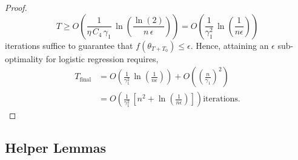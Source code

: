 \documentclass{article}
\begin{document}
\begin{proof}
\[
T \geq O \left( \frac{1}{\eta \,C_4\, \gamma_1} \, \ln\left(\frac{\ln(2)}{n \, \epsilon} \right) \right) =  O \left( \frac{1}{\gamma_1^2} \, \ln\left(\frac{1}{n \epsilon}\right) \right)
\]
iterations suffice to guarantee that $f(\theta_{T + T_0}) \leq \epsilon$. Hence, attaining an $\epsilon$ sub-optimality for logistic regression requires, 
\begin{align*}
T_{\text{final}} &= O \left( \frac{1}{\gamma_1^2} \, \ln\left(\frac{1}{n \epsilon}\right) \right) + O \left( \left(\frac{n}{\gamma_1}\right)^2  \right) \\
&= O\left(  \frac{1}{\gamma_1^2} \, \left[n^2 + \ln\left(\frac{1}{n \epsilon}\right)\right]\right) \text{iterations}. 
\end{align*}     
\end{proof}

\subsection{Helper Lemmas}
\label{app:adam-helper-lemmas}
\end{document}

